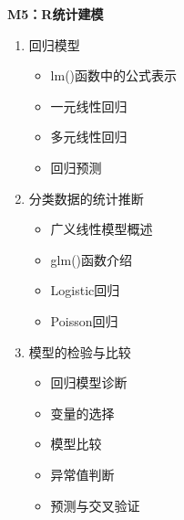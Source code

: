 \documentclass[12pt,hyperref,]{ctexart}
\providecommand{\tightlist}{%
  \setlength{\itemsep}{0pt}\setlength{\parskip}{0pt}}
\begin{document}
\textbf{M5：R统计建模}

\begin{enumerate}
\def\labelenumi{\arabic{enumi}.}
\item
  回归模型

  \begin{itemize}
  \tightlist
  \item
    lm()函数中的公式表示
  \item
    一元线性回归
  \item
    多元线性回归
  \item
    回归预测
  \end{itemize}
\item
  分类数据的统计推断

  \begin{itemize}
  \tightlist
  \item
    广义线性模型概述
  \item
    glm()函数介绍
  \item
    Logistic回归
  \item
    Poisson回归
  \end{itemize}
\item
  模型的检验与比较

  \begin{itemize}
  \tightlist
  \item
    回归模型诊断
  \item
    变量的选择
  \item
    模型比较
  \item
    异常值判断
  \item
    预测与交叉验证
  \end{itemize}
\end{enumerate}
\end{document}
